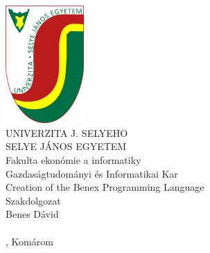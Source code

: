 \documentclass[a4paper,oneside,onecolumn,12pt]{LegrandOrangeBook}
\begin{document}
\thispagestyle{empty}
\begin{minipage}[c][\textheight][c]{\textwidth}
    {
        \centering
        \includegraphics[keepaspectratio,width=3cm]{SelyeBanner.png} \\
        \vskip0.5cm
        {\LARGE UNIVERZITA J. SELYEHO} \\
        \vskip0.5cm
        {\LARGE SELYE JÁNOS EGYETEM} \\
        \vskip0.5cm
        {\large Fakulta ekonómie a informatiky} \\
        \vskip0.5cm
        {\large Gazdaságtudományi és Informatikai Kar} \\
        \vfill
        {\Huge Creation of the Benex Programming Language} \\
        Szakdolgozat \\
        Benes Dávid \\
        \ISBN \\
        \hfill\the\year{}, Komárom\hfill
    }
\end{minipage}
\cleardoublepage
\end{document}
